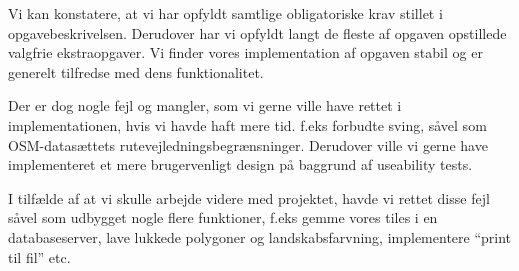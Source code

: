 Vi kan konstatere, at vi har opfyldt samtlige obligatoriske krav stillet i opgavebeskrivelsen. Derudover har vi opfyldt langt de fleste af opgaven opstillede valgfrie ekstraopgaver. Vi finder vores implementation af opgaven stabil og er generelt tilfredse med dens funktionalitet. 

Der er dog nogle fejl og mangler, som vi gerne ville have rettet i implementationen, hvis vi havde haft mere tid. f.eks forbudte sving, såvel som OSM-datasættets rutevejledningsbegrænsninger. Derudover ville vi gerne have implementeret et mere brugervenligt design på baggrund af useability tests. 

I tilfælde af at vi skulle arbejde videre med projektet, havde vi rettet disse fejl såvel som udbygget nogle flere funktioner, f.eks gemme vores tiles i en databaseserver, lave lukkede polygoner og landskabsfarvning, implementere ``print til fil'' etc. 